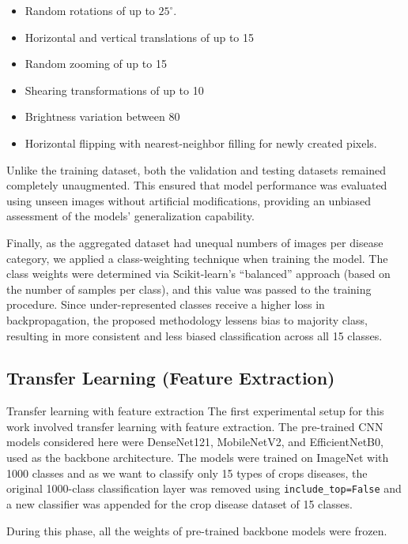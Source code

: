 \begin{itemize}
\item Random rotations of up to $25^\circ$.
\item Horizontal and vertical translations of up to 15%
\item Random zooming of up to 15%
\item Shearing transformations of up to 10%
\item Brightness variation between 80%
\item Horizontal flipping with nearest-neighbor filling for newly created pixels.
\end{itemize}

Unlike the training dataset, both the validation and testing datasets remained completely unaugmented. This ensured that model performance was evaluated using unseen images without artificial modifications, providing an unbiased assessment of the models' generalization capability.

Finally, as the aggregated dataset had unequal numbers of images per disease category, we applied a class-weighting technique when training the model. The class weights were determined via Scikit-learn’s “balanced” approach (based on the number of samples per class), and this value was passed to the training procedure. Since under-represented classes receive a higher loss in backpropagation, the proposed methodology lessens bias to majority class, resulting in more consistent and less biased classification across all 15 classes.




\subsection{Transfer Learning (Feature Extraction)}

Transfer learning with feature extraction The first experimental setup for this work involved transfer learning with feature extraction. The pre-trained CNN models considered here were DenseNet121, MobileNetV2, and EfficientNetB0, used as the backbone architecture. The models were trained on ImageNet with 1000 classes and as we want to classify only 15 types of crops diseases, the original 1000-class classification layer was removed using \texttt{include\_top=False} and a new classifier was appended for the crop disease dataset of 15 classes. 

During this phase, all the weights of pre-trained backbone models were frozen. 



